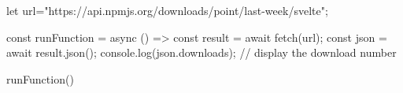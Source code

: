 let url="https://api.npmjs.org/downloads/point/last-week/svelte";

const runFunction = async () => {
    const result = await fetch(url);
    const json = await result.json();
    console.log(json.downloads); // display the download number
}

runFunction()